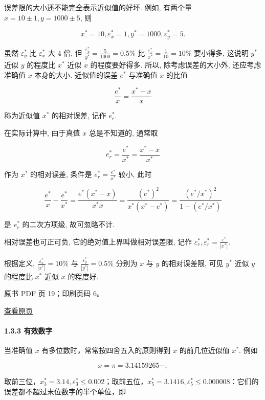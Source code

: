 误差限的大小还不能完全表示近似值的好坏. 例如, 有两个量 \(x = 10 \pm 1, y = 1000 \pm 5\), 则

\[
x^* = 10, \varepsilon_x^* = 1, y^* = 1000, \varepsilon_y^* = 5.
\]

虽然 \(\varepsilon_y^*\) 比 \(\varepsilon_x^*\) 大 4 倍, 但 \(\frac{\varepsilon_y^*}{y^*} = \frac{5}{1000} = 0.5\%\) 比 \(\frac{\varepsilon_x^*}{x^*} = \frac{1}{10} = 10\%\) 要小得多, 这说明 \(y^*\) 近似 \(y\) 的程度比 \(x^*\) 近似 \(x\) 的程度要好得多. 所以, 除考虑误差的大小外, 还应考虑准确值 \(x\) 本身的大小. 近似值的误差 \(e^*\) 与准确值 \(x\) 的比值

\[
\frac{e^*}{x} = \frac{x^* - x}{x}
\]

称为近似值 \(x^*\) 的相对误差, 记作 \(e_r^*\).

在实际计算中, 由于真值 \(x\) 总是不知道的, 通常取

\[
e_r^* = \frac{e^*}{x^*} = \frac{x^* - x}{x^*}
\]

作为 \(x^*\) 的相对误差, 条件是 \(e_r^* = \frac{e^*}{x^*}\) 较小, 此时

\[
\frac{e^*}{x} - \frac{e^*}{x^*} = \frac{e^* (x^* - x)}{x^* x} = \frac{(e^*)^2}{x^* (x^* - e^*)} = \frac{(e^* / x^*)^2}{1 - (e^* / x^*)}
\]

是 \(e_r^*\) 的二次方项级, 故可忽略不计.

相对误差也可正可负, 它的绝对值上界叫做相对误差限, 记作 \(\varepsilon_r^*, \varepsilon_r^* = \frac{\varepsilon^*}{|x^*|}\).

根据定义, \(\frac{\varepsilon_x^*}{|x^*|} = 10\%\) 与 \(\frac{\varepsilon_y^*}{|y^*|} = 0.5\%\) 分别为 \(x\) 与 \(y\) 的相对误差限, 可见 \(y^*\) 近似 \(y\) 的程度比 \(x^*\) 近似 \(x\) 的程度好.

\clearpage

原书 PDF 页 19；印刷页码 6。

\href{source-images/pdf-019.jpeg}{查看原页}

\paragraph{1.3.3 有效数字}\label{ch01-ux6709ux6548ux6570ux5b57}

当准确值 \(x\) 有多位数时，常常按四舍五入的原则得到 \(x\) 的前几位近似值 \(x^*\). 例如

\[
x = \pi = 3.14159265\cdots,
\]

取前三位，\(x_3^* = 3.14, \varepsilon_3^* \leqslant 0.002\)；取前五位，\(x_5^* = 3.1416, \varepsilon_5^* \leqslant 0.000008\)：它们的误差都不超过末位数字的半个单位，即

